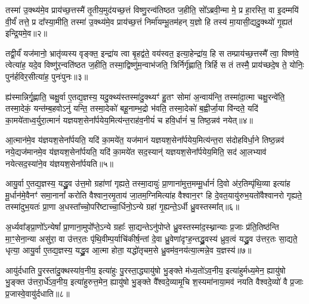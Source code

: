 तस्मा॑ उ॒क्थ्य॑मे॒व प्राय॑च्छ॒त्तस्मै॑ तृ॒तीय॒मुद॑यच्छ॒त्तं विष्णु॒रन्व॑तिष्ठत ज॒हीति॒ सो᳚\-ऽब्रवी॒न्मा मे॒ प्र हा॒रस्ति॒ वा इ॒दम्मयि॑ वी॒र्यं॑ तत्ते॒ प्र दा᳚स्या॒मीति॒ तस्मा॑ उ॒क्थ्य॑मे॒व प्राय॑च्छ॒त्तं निर्मा॑यम्भू॒तम॑हन् य॒ज्ञो हि तस्य॑ मा॒यासी॒द्यदु॒क्थ्यो॑ गृ॒ह्यत॑ इन्द्रि॒यमे॒व॥२॥

तद्वी॒र्यं॑ यज॑मानो॒ भ्रातृ॑व्यस्य वृङ्क्त॒ इन्द्रा॑य त्वा बृ॒हद्व॑ते॒ वय॑स्वत॒ इत्या॒हेन्द्रा॑य॒ हि स तम्प्राय॑च्छ॒त्तस्मै᳚ त्वा॒ विष्ण॑वे॒ त्वेत्या॑ह॒ यदे॒व विष्णु॑र॒न्वति॑ष्ठत ज॒हीति॒ तस्मा॒द्विष्णु॑म॒न्वाभ॑जति॒ त्रिर्निर्गृ॑ह्णाति॒ त्रिर्\mbox{}हि स तं तस्मै॒ प्राय॑च्छदे॒ष ते॒ योनिः॒ पुन॑र्\mbox{}हविर॒सीत्या॑ह॒ पुनः॑पुनः॥३॥

ह्य॑स्मान्निर्गृ॒ह्णाति॒ चक्षु॒र्वा ए॒तद्य॒ज्ञस्य॒ यदु॒क्थ्य॑स्तस्मा॑दु॒क्थ्यꣳ॑ हु॒तꣳ सोमा॑ अ॒न्वाय॑न्ति॒ तस्मा॑दा॒त्मा चक्षु॒रन्वे॑ति॒ तस्मा॒देकं॒ यन्त॑म्ब॒हवो\-ऽनु॑ यन्ति॒ तस्मा॒देको॑ बहू॒नाम्भ॒द्रो भ॑वति॒ तस्मा॒देको॑ ब॒ह्वीर्जा॒या वि॑न्दते॒ यदि॑ का॒मये॑ताध्व॒र्युरा॒त्मानं॑ यज्ञयश॒सेना᳚र्पयेय॒मित्य॑न्त॒राह॑व॒नीयं॑ च हवि॒र्धानं॑ च॒ तिष्ठ॒न्नव॑ नयेत्॥४॥

आ॒त्मान॑मे॒व य॑ज्ञयश॒सेना᳚र्पयति॒ यदि॑ का॒मये॑त॒ यज॑मानं यज्ञयश॒सेना᳚र्पयेय॒मित्य॑न्त॒रा स॑दोहविर्धा॒ने तिष्ठ॒न्नव॑ नये॒द्यज॑मानमे॒व य॑ज्ञयश॒सेना᳚र्पयति॒ यदि॑ का॒मये॑त सद॒स्यान्॑ यज्ञयश॒सेना᳚र्पयेय॒मिति॒ सद॑ आ॒लभ्याव॑ नयेत्सद॒स्या॑ने॒व य॑ज्ञयश॒सेना᳚र्पयति॥५॥

{\anuvakamend[{इती᳚न्द्रि॒यमे॒व पुनः॑पुनर्नये॒त्त्रय॑स्त्रिꣳशच्च॥१॥}]}

आयु॒र्वा ए॒तद्य॒ज्ञस्य॒ यद्ध्रु॒व उ॑त्त॒मो ग्रहा॑णां गृह्यते॒ तस्मा॒दायुः॑ प्रा॒णाना॑मुत्त॒मम्मू॒र्धानं॑ दि॒वो अ॑र॒तिम्पृ॑थि॒व्या इत्या॑ह मू॒र्धान॑मे॒वैनꣳ॑ समा॒नानां᳚ करोति वैश्वान॒रमृ॒ताय॑ जा॒तम॒ग्निमित्या॑ह वैश्वान॒रꣳ हि दे॒वत॒यायु॑रुभ॒यतो॑वैश्वानरो गृह्यते॒ तस्मा॑दुभ॒यतः॑ प्रा॒णा अ॒धस्ता᳚च्चो॒परि॑ष्टाच्चा॒र्धिनो॒\-ऽन्ये ग्रहा॑ गृ॒ह्यन्ते॒\-ऽर्धी ध्रु॒वस्तस्मा᳚त्॥६॥

अ॒र्ध्यवा᳚ङ्प्रा॒णो᳚\-ऽन्येषां᳚ प्रा॒णाना॒मुपो᳚प्ते॒\-ऽन्ये ग्रहाः᳚ सा॒द्यन्ते\-ऽनु॑पोप्ते ध्रु॒वस्तस्मा॑द॒स्थ्नान्याः प्र॒जाः प्र॑ति॒तिष्ठ॑न्ति मा॒ꣳ॒सेना॒न्या असु॑रा॒ वा उ॑त्तर॒तः पृ॑थि॒वीम्प॒र्याचि॑कीर्\mbox{}ष॒न्तां दे॒वा ध्रु॒वेणा॑दृꣳह॒न्तद्ध्रु॒वस्य॑ ध्रुव॒त्वं यद्ध्रु॒व उ॑त्तर॒तः सा॒द्यते॒ धृत्या॒ आयु॒र्वा ए॒तद्य॒ज्ञस्य॒ यद्ध्रु॒व आ॒त्मा होता॒ यद्धो॑तृचम॒से ध्रु॒वम॑व॒नय॑त्या॒त्मन्ने॒व य॒ज्ञस्य॑॥७॥

आयु॑र्दधाति पु॒रस्ता॑दु॒क्थस्या॑व॒नीय॒ इत्या॑हुः पु॒रस्ता॒द्ध्यायु॑षो भु॒ङ्क्ते म॑ध्य॒तो॑\-ऽव॒नीय॒ इत्या॑हुर्मध्य॒मेन॒ ह्यायु॑षो भु॒ङ्क्त उ॑त्तरा॒र्धे॑\-ऽव॒नीय॒ इत्या॑हुरुत्त॒मेन॒ ह्यायु॑षो भु॒ङ्क्ते वै᳚श्वदे॒व्यामृ॒चि श॒स्यमा॑नाया॒मव॑ नयति वैश्वदे॒व्यो॑ वै प्र॒जाः प्र॒जास्वे॒वायु॑र्दधाति॥८॥

